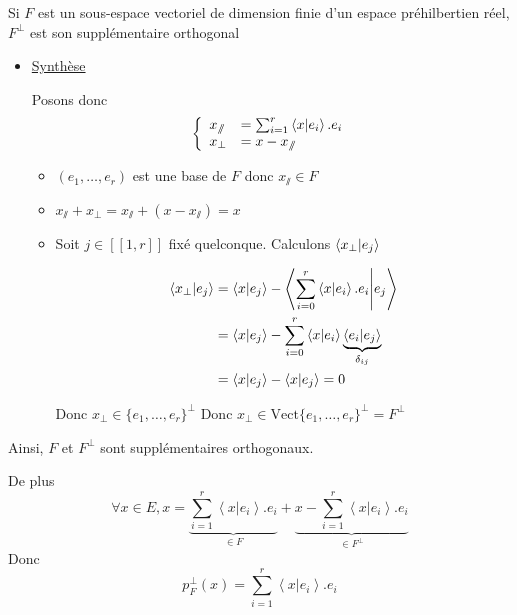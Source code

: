 \documentclass{article}
\renewenvironment{question_kholle}[2][ ]
{
	\subsection{\texorpdfstring{#2}{}}
	\notblank{#1}
	{
		\noindent #1
		\bigbreak
	}
	{}
	\begin{proof}
}
{
	\end{proof}
}
\begin{document}
\begin{question_kholle}{Si $F$ est un sous-espace vectoriel de dimension finie d'un espace préhilbertien réel, $F^{\perp}$ est son supplémentaire orthogonal}
\begin{itemize}[label=$\lozenge$]
    \item \underline{Synthèse}

          Posons donc
          $$\left\{ \begin{array}{ll}
              x_{\sslash} & = \sum_{i=1}^{r} \braket{ x | e_{i} } .e_{i} \\
              x_{\perp}   & = x - x_{\sslash}
            \end{array}\right. $$
          \begin{itemize}[label=$\star$]
            \item $(e_{1}, \dots, e_{r})$ est une base de $F$ donc $x_{\sslash} \in F$
            \item $x_{\sslash}+x_{\perp} = x_{\sslash}+ (x - x_{\sslash}) = x$
            \item Soit $j \in [ \! [ 1, r ] \!]$ fixé quelconque. Calculons $\braket{ x_{\perp} | e_{j} }$

                  \begin{align*}
                    \braket{ x_{\perp} | e_{j} } & = \braket{ x | e_{j} }  - \left\langle  \sum_{i=0}^{r}\braket{ x | e_{i} } .e_{i} \Bigg|  e_{j} \right\rangle                                                         \\
                                                 & = \left\langle x | e_{j} \right\rangle - \sum_{i=0}^{r} \left\langle x | e_{i} \right\rangle\underbrace{  \left\langle e_{i} | e_{j} \right\rangle  }_{ \delta_{ij} } \\
                                                 & = \left\langle x | e_{j} \right\rangle  - \left\langle x | e_{j} \right\rangle  = 0
                  \end{align*}


                  Donc $x_{\perp} \in \{e_{1}, \dots, e_{r}\}^{\perp}$
                  Donc $x_{\perp} \in \text{Vect}\{ e_{1}, \dots, e_{r} \}^{\perp} = F^{\perp}$

          \end{itemize}
  \end{itemize}
  Ainsi, $F$ et $F^{\perp}$ sont supplémentaires orthogonaux.

  De plus
  $$	\forall x \in E, x = \underbrace{ \sum_{i=1}^{r}\left\langle x | e_{i} \right\rangle .e_{i} }_{ \in F } + \underbrace{x - \sum_{i=1}^{r}\left\langle x | e_{i} \right\rangle .e_{i}  }_{ \in F^{\perp} }$$
  Donc $$p_{F}^{\perp}(x) = \sum_{i=1}^{r}\left\langle x | e_{i} \right\rangle .e_{i} $$

\end{question_kholle}
\end{document}
